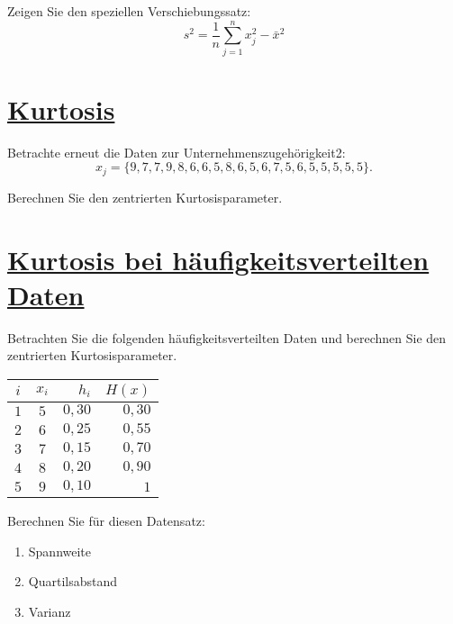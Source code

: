 \documentclass[12pt,a4paper]{article}
\newcommand{\tmpsection}[1]{}
\let\tmpsection=\section
\renewcommand{\section}[1]{\tmpsection{\underline{#1}} }
\begin{document}
Zeigen Sie den speziellen Verschiebungssatz:
\[s^2 =\frac{1}{n}\sum_{j=1}^nx_j^2-\bar{x}^2\]

\hypertarget{kurtosis}{%
\section{Kurtosis}\label{kurtosis}}

Betrachte erneut die Daten zur Unternehmenszugehörigkeit2:
\begin{equation*}
x_j = \{9, 7, 7, 9, 8, 6, 6, 5, 8, 6, 5, 6, 7, 5, 6, 5, 5, 5, 5, 5\}.
\end{equation*}

Berechnen Sie den zentrierten Kurtosisparameter.

\newpage

\hypertarget{kurtosis-bei-huxe4ufigkeitsverteilten-daten}{%
\section{Kurtosis bei häufigkeitsverteilten
Daten}\label{kurtosis-bei-huxe4ufigkeitsverteilten-daten}}

Betrachten Sie die folgenden häufigkeitsverteilten Daten und berechnen
Sie den zentrierten Kurtosisparameter.

\begin{center}
  \begin{tabular}{ccrr}
    $i$ &   $x_i$ & $h_i$ & $H(x)$ \\[2mm]
  \toprule
    $1$ & $5$ & $0,30$ & $0,30$ \\[2mm]
    $2$ & $6$ & $0,25$ & $0,55$ \\[2mm]
    $3$ & $7$ & $0,15$ & $0,70$ \\[2mm]
    $4$ & $8$ & $0,20$ & $0,90$ \\[2mm]
    $5$ & $9$ & $0,10$ & $1$ \\[2mm]
  \end{tabular}
\end{center}

\newpage

Berechnen Sie für diesen Datensatz:

\begin{enumerate}[label=(\alph*)]
  \item Spannweite 
  \item Quartilsabstand 
  \item Varianz
\end{enumerate}
\end{document}
